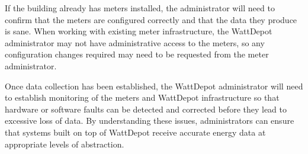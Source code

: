 If the building already has meters installed, the administrator will need to confirm that the meters are configured correctly and that the data they produce  is sane. When working with existing meter infrastructure, the WattDepot administrator may not have administrative access to the meters, so any configuration changes required may need to be requested from the meter administrator.

Once data collection has been established, the WattDepot administrator will need to establish monitoring of the meters and WattDepot infrastructure so that hardware or software faults can be detected and corrected before they lead to excessive loss of data. By understanding these issues, administrators can ensure that systems built on top of WattDepot receive accurate energy data at appropriate levels of abstraction.
